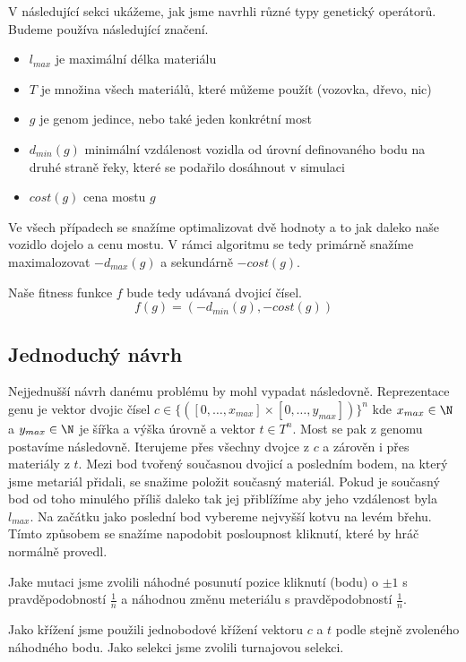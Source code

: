 V následující sekci ukážeme, jak jsme navrhli různé typy genetický operátorů. Budeme používa následující značení.
\begin{itemize}
    \item $l_{max}$ je maximální délka materiálu
    \item $T$ je množina všech materiálů, které můžeme použít (vozovka, dřevo, nic)
    \item $g$ je genom jedince, nebo také jeden konkrétní most
    \item $d_{min}(g)$ minimální vzdálenost vozidla od úrovní definovaného bodu na druhé straně řeky, které se podařilo dosáhnout v simulaci
    \item $cost(g)$ cena mostu $g$
\end{itemize}

Ve všech případech se snažíme optimalizovat dvě hodnoty a to jak daleko naše vozidlo dojelo a cenu mostu. V rámci algoritmu se tedy primárně snažíme maximalozovat $-d_{max}(g)$ a sekundárně $-cost(g)$.

Naše fitness funkce $f$ bude tedy udávaná dvojicí čísel. $$f(g) = (-d_{min}(g), -cost(g))$$

\subsection{Jednoduchý návrh}

Nejjednušší návrh danému problému by mohl vypadat následovně. Reprezentace genu je vektor dvojic čísel $c \in \{([0, \dots, x_{max}] \times [0, \dots, y_{max}])\}^n$ kde $x_{max} \in \N$ a $y_{max} \in \N$ je šířka a výška úrovně a vektor $t \in T^n$. Most se pak z genomu postavíme následovně. Iterujeme přes všechny dvojce z $c$ a zárověn i přes materiály z $t$. Mezi bod tvořený současnou dvojicí a posledním bodem, na který jsme metariál přidali, se snažime položit současný materiál. Pokud je současný bod od toho minulého příliš daleko tak jej přiblížíme aby jeho vzdálenost byla $l_{max}$. Na začátku jako poslední bod vybereme nejvyšší kotvu na levém břehu. Tímto způsobem se snažíme napodobit posloupnost kliknutí, které by hráč normálně provedl.

Jake mutaci jsme zvolili náhodné posunutí pozice kliknutí (bodu) o $\pm 1$ s pravděpodobností $\frac{1}{n}$ a náhodnou změnu meteriálu s pravděpodobností $\frac{1}{n}$.

Jako křížení jsme použili jednobodové křížení vektoru $c$ a $t$ podle stejně zvoleného náhodného bodu. Jako selekci jsme zvolili turnajovou selekci.

